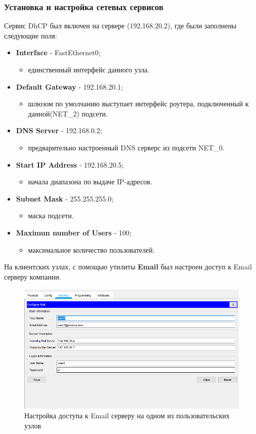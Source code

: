 \documentclass[14pt,a4paper,report]{report}
\begin{document}
\subsubsection{Установка и настройка сетевых сервисов}
Сервис DhCP был включен на сервере (192.168.20.2), где были заполнены следующие поля:
\begin{itemize}
\item \textbf{Interface} - FastEthernet0;
\begin{itemize}
\item единственный интерфейс данного узла.
\end{itemize}
\item \textbf{Default Gateway} - 192.168.20.1;
\begin{itemize}
\item шлюзом по умолчанию выступает интерфейс роутера, подключенный к данной(NET\_2) подсети.
\end{itemize}
\item \textbf{DNS Server} - 192.168.0.2;
\begin{itemize}
\item предварительно настроенный DNS серверс из подсети NET\_0.
\end{itemize}
\item \textbf{Start IP Address} - 192.168.20.5;
\begin{itemize}
\item начала диапазона по выдаче IP-адресов.
\end{itemize}
\item \textbf{Subnet Mask} - 255.255.255.0;
\begin{itemize}
\item маска подсети.
\end{itemize}
\item \textbf{Maximun number of Users} - 100;
\begin{itemize}
\item максимальное количество пользователей.
\end{itemize}
\end{itemize}
На клиентских узлах, с помощью утилиты \textbf{Email} был настроен доступ к Email серверу компании.
\begin{figure}[h]
  \centering
  \includegraphics[width=.8\textwidth]{img/3}
  \caption{Настройка доступа к Email серверу на одном из пользовательских узлов}
\end{figure}
\end{document}
